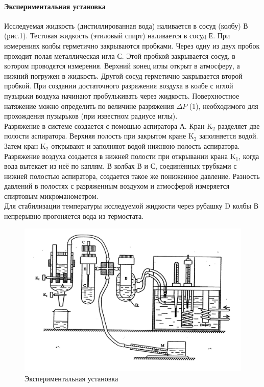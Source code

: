 \documentclass[a4paper,12pt]{article}
\begin{document}
\paragraph{Экспериментальная установка\\}
Исследуемая жидкость (дистиллированная вода) наливается в сосуд (колбу) В (рис.1). Тестовая жидкость  (этиловый спирт) наливается  в сосуд Е.  При измерениях  колбы герметично закрываются  пробками.   Через одну из двух пробок  проходит полая металлическая игла С. Этой пробкой закрывается сосуд, в котором  проводятся измерения. Верхний конец иглы открыт в атмосферу, а нижний погружен в жидкость. Другой сосуд герметично закрывается второй пробкой. При создании достаточного  разряжения воздуха в колбе с иглой пузырьки воздуха начинают пробулькивать через жидкость. Поверхностное натяжение можно определить по величине разряжения $\Delta P$ (1), необходимого для прохождения пузырьков (при известном радиусе иглы).\\
Разряжение в системе создается с помощью аспиратора А. Кран $\text{K}_2$ разделяет две полости аспиратора. Верхняя полость при закрытом кране $\text{K}_2$  заполняется водой. Затем кран $\text{K}_2$ открывают и заполняют водой  нижнюю полость  аспиратора.  Разряжение воздуха создается в нижней полости  при открывании крана $\text{K}_1$, когда  вода вытекает из неё по каплям. В колбах В и С, соединённых трубками с нижней полостью аспиратора,  создается такое же пониженное давление. Разность давлений в полостях с разряженным воздухом и атмосферой измеряется спиртовым микроманометром. \\
Для стабилизации температуры исследуемой жидкости через рубашку D колбы В непрерывно прогоняется вода из термостата.
\begin{figure}[h]
    \centering
    \includegraphics[width=0.5\linewidth]{Установка.jpg}
    \caption{Экспериментальная установка}
    \label{fig:my_label}
\end{figure}
\end{document}
